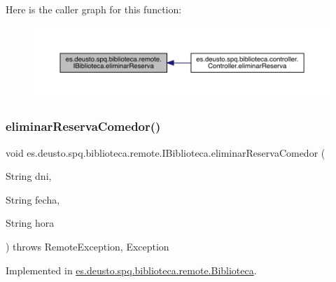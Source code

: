 Here is the caller graph for this function\+:
\nopagebreak
\begin{figure}[H]
\begin{center}
\leavevmode
\includegraphics[width=350pt]{interfacees_1_1deusto_1_1spq_1_1biblioteca_1_1remote_1_1_i_biblioteca_abb2449f5cc79a04e38cb5898cea35ffc_icgraph}
\end{center}
\end{figure}
\mbox{\label{interfacees_1_1deusto_1_1spq_1_1biblioteca_1_1remote_1_1_i_biblioteca_a36db52ba728865b02b2f25024d942149}} 
\subsubsection{\texorpdfstring{eliminar\+Reserva\+Comedor()}{eliminarReservaComedor()}}
{\footnotesize\ttfamily void es.\+deusto.\+spq.\+biblioteca.\+remote.\+I\+Biblioteca.\+eliminar\+Reserva\+Comedor (\begin{DoxyParamCaption}\item[{String}]{dni,  }\item[{String}]{fecha,  }\item[{String}]{hora }\end{DoxyParamCaption}) throws Remote\+Exception, Exception}



Implemented in \mbox{\hyperlink{classes_1_1deusto_1_1spq_1_1biblioteca_1_1remote_1_1_biblioteca_a83e80de66b9deeec2c025a8443df515a}{es.\+deusto.\+spq.\+biblioteca.\+remote.\+Biblioteca}}.

